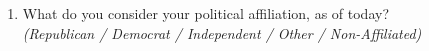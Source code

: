 \documentclass[11pt]{article}
\begin{document}
\begin{enumerate}[resume]
    \item What do you consider your political affiliation, as of today? \\
    \textit{(Republican / Democrat / Independent / Other / Non-Affiliated)}
\end{enumerate}
\end{document}
